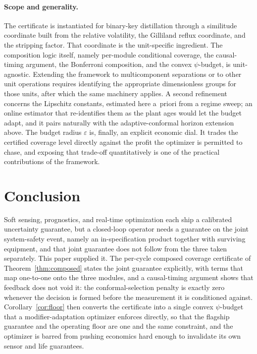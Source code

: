 \documentclass[review,12pt]{elsarticle}
\theoremstyle{definition}
\begin{document}
\paragraph{Scope and generality.}
The certificate is instantiated for binary-key distillation through a similitude
coordinate built from the relative volatility, the Gilliland reflux coordinate, and the
stripping factor. That coordinate is the unit-specific ingredient. The composition logic
itself, namely per-module conditional coverage, the causal-timing argument, the Bonferroni
composition, and the convex $\psi$-budget, is unit-agnostic. Extending the framework to
multicomponent separations or to other unit operations requires identifying the
appropriate dimensionless groups for those units, after which the same machinery applies.
A second refinement concerns the Lipschitz constants, estimated here a~priori from a
regime sweep; an online estimator that re-identifies them as the plant ages would let the
budget adapt, and it pairs naturally with the adaptive-conformal horizon extension above.
The budget radius $\varepsilon$ is, finally, an explicit economic dial. It trades the
certified coverage level directly against the profit the optimizer is permitted to chase,
and exposing that trade-off quantitatively is one of the practical contributions of the
framework.

\section{Conclusion}
\label{sec:conclusion}

Soft sensing, prognostics, and real-time optimization each ship a calibrated uncertainty
guarantee, but a closed-loop operator needs a guarantee on the joint system-safety event,
namely an in-specification product together with surviving equipment, and that joint
guarantee does not follow from the three taken separately. This paper supplied it. The
per-cycle composed coverage certificate of Theorem~\ref{thm:composed} states the joint
guarantee explicitly, with terms that map one-to-one onto the three modules, and a
causal-timing argument shows that feedback does not void it: the conformal-selection
penalty is exactly zero whenever the decision is formed before the measurement it is
conditioned against. Corollary~\ref{cor:floor} then converts the certificate into a
single convex $\psi$-budget that a modifier-adaptation optimizer enforces directly, so
that the flagship guarantee and the operating floor are one and the same constraint, and
the optimizer is barred from pushing economics hard enough to invalidate its own sensor
and life guarantees.
\end{document}
